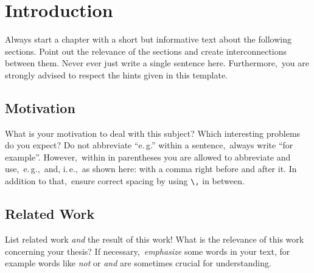 \chapter{Introduction} \label{chap:intro}
Always start a chapter with a short but informative text about the following sections\@. Point out the relevance of the sections and create interconnections between them\@. Never ever just write a single sentence here\@. Furthermore,\ you are strongly advised to respect the hints given in this template\@.

\section{Motivation}
What is your motivation to deal with this subject\@? Which interesting problems do you expect\@? Do not abbreviate \enquote{e.\,g.\/} within a sentence,\ always write \enquote{for example}\@. However,\ within in parentheses you are allowed to abbreviate and use,\ e.\,g.,\ and, i.\,e.,\ as shown here: with a comma right before and after it\@. In addition to that,\ ensure correct spacing by using \texttt{\textbackslash,} in between\@.

\section{Related Work}
List related work \emph{and} the result of this work\@! What is the relevance of this work concerning your thesis\@? If necessary,\ \emph{emphasize} some words in your text, for example words like \emph{not} or \emph{and} are sometimes crucial for understanding\@.
